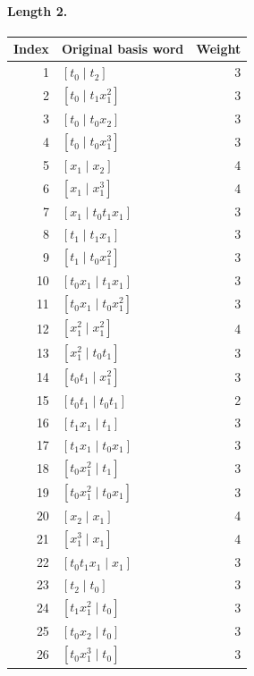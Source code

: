 \paragraph{Length 2.}
\begin{longtable}{r l r}
Index & Original basis word & Weight\\\hline
\endhead
1 & $[t_0\mid t_2]$ & 3\\
2 & $[t_0\mid t_1 x_1^{2}]$ & 3\\
3 & $[t_0\mid t_0 x_2]$ & 3\\
4 & $[t_0\mid t_0 x_1^{3}]$ & 3\\
5 & $[x_1\mid x_2]$ & 4\\
6 & $[x_1\mid x_1^{3}]$ & 4\\
7 & $[x_1\mid t_0 t_1 x_1]$ & 3\\
8 & $[t_1\mid t_1 x_1]$ & 3\\
9 & $[t_1\mid t_0 x_1^{2}]$ & 3\\
10 & $[t_0 x_1\mid t_1 x_1]$ & 3\\
11 & $[t_0 x_1\mid t_0 x_1^{2}]$ & 3\\
12 & $[x_1^{2}\mid x_1^{2}]$ & 4\\
13 & $[x_1^{2}\mid t_0 t_1]$ & 3\\
14 & $[t_0 t_1\mid x_1^{2}]$ & 3\\
15 & $[t_0 t_1\mid t_0 t_1]$ & 2\\
16 & $[t_1 x_1\mid t_1]$ & 3\\
17 & $[t_1 x_1\mid t_0 x_1]$ & 3\\
18 & $[t_0 x_1^{2}\mid t_1]$ & 3\\
19 & $[t_0 x_1^{2}\mid t_0 x_1]$ & 3\\
20 & $[x_2\mid x_1]$ & 4\\
21 & $[x_1^{3}\mid x_1]$ & 4\\
22 & $[t_0 t_1 x_1\mid x_1]$ & 3\\
23 & $[t_2\mid t_0]$ & 3\\
24 & $[t_1 x_1^{2}\mid t_0]$ & 3\\
25 & $[t_0 x_2\mid t_0]$ & 3\\
26 & $[t_0 x_1^{3}\mid t_0]$ & 3\\
\end{longtable}

